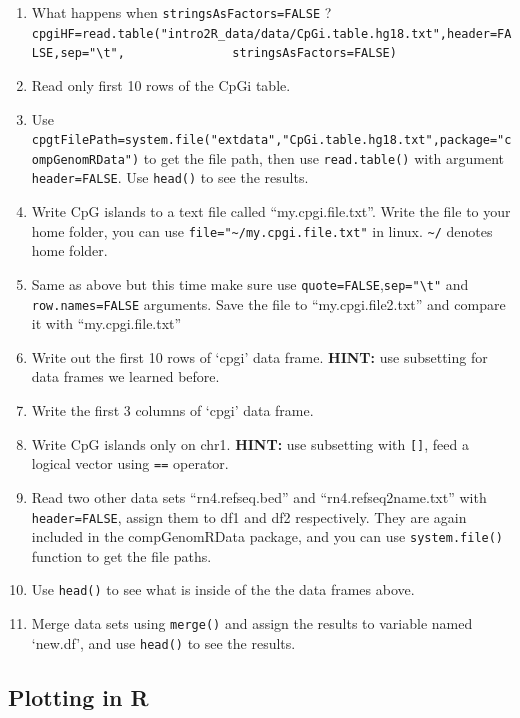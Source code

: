\documentclass[12pt,]{krantz}
\begin{document}
\begin{enumerate}
\def\labelenumi{\arabic{enumi}.}
\setcounter{enumi}{42}
\item
  What happens when \texttt{stringsAsFactors=FALSE} ?
  \texttt{cpgiHF=read.table("intro2R\_data/data/CpGi.table.hg18.txt",header=FALSE,sep="\textbackslash{}t",\ \ \ \ \ \ \ \ \ \ \ \ \ \ \ stringsAsFactors=FALSE)}
\item
  Read only first 10 rows of the CpGi table.
\item
  Use \texttt{cpgtFilePath=system.file("extdata","CpGi.table.hg18.txt",package="compGenomRData")} to get the file path, then use
  \texttt{read.table()} with argument \texttt{header=FALSE}. Use \texttt{head()} to see the results.
\item
  Write CpG islands to a text file called ``my.cpgi.file.txt''. Write the file
  to your home folder, you can use \texttt{file="\textasciitilde{}/my.cpgi.file.txt"} in linux. \texttt{\textasciitilde{}/} denotes
  home folder.
\item
  Same as above but this time make sure use \texttt{quote=FALSE},\texttt{sep="\textbackslash{}t"} and \texttt{row.names=FALSE} arguments.
  Save the file to ``my.cpgi.file2.txt'' and compare it with ``my.cpgi.file.txt''
\item
  Write out the first 10 rows of `cpgi' data frame.
  \textbf{HINT:} use subsetting for data frames we learned before.
\item
  Write the first 3 columns of `cpgi' data frame.
\item
  Write CpG islands only on chr1. \textbf{HINT:} use subsetting with \texttt{{[}{]}}, feed a logical vector using \texttt{==} operator.
\item
  Read two other data sets ``rn4.refseq.bed'' and ``rn4.refseq2name.txt''
  with \texttt{header=FALSE}, assign them to df1 and df2 respectively.
  They are again included in the compGenomRData package, and you
  can use \texttt{system.file()} function to get the file paths.
\item
  Use \texttt{head()} to see what is inside of the the data frames above.
\item
  Merge data sets using \texttt{merge()} and assign the results to variable named `new.df', and use \texttt{head()} to see the results.
\end{enumerate}

\hypertarget{plotting-in-r-1}{%
\subsection{Plotting in R}\label{plotting-in-r-1}}
\end{document}

